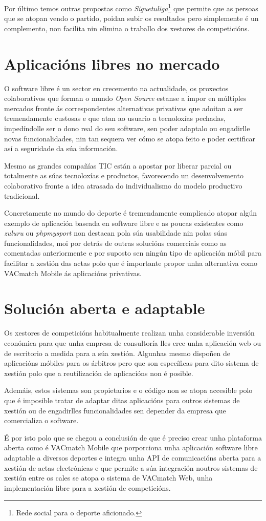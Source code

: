     Por último temos outras propostas como \emph{Siguetuliga}\footnote{Rede 
social para o deporte aficionado.} que permite que as persoas que se atopan 
vendo o partido, poidan subir os resultados pero simplemente é un complemento, 
non facilita nin elimina o traballo dos xestores de competicións.

  \section{Aplicacións libres no mercado}

    O software libre é un sector en crecemento na actualidade, os proxectos 
colaborativos que forman o mundo \emph{Open Source} estanse a impor en múltiples 
mercados fronte ás correspondentes alternativas privativas que adoitan a ser 
tremendamente custosas e que atan ao usuario a tecnoloxías pechadas, 
impedíndolle ser o dono real do seu software, sen poder adaptalo ou engadirlle 
novas funcionalidades, nin tan sequera ver cómo se atopa feito e poder 
certificar así a seguridade da súa información.

    Mesmo as grandes compañías TIC están a apostar por liberar parcial ou totalmente as 
súas tecnoloxías e productos, favorecendo un desenvolvemento colaborativo fronte a idea 
atrasada do individualismo do modelo productivo tradicional.

    Concretamente no mundo do deporte é tremendamente complicado atopar algún 
exemplo de aplicación baseada en software libre e as poucas existentes como 
\emph{zuluru} ou \emph{phpmysport} non destacan pola súa usabilidade nin polas 
súas funcionalidades, moi por detrás de outras solucións comerciais como as 
comentadas anteriormente e por suposto sen ningún tipo de aplicación móbil 
para facilitar a xestión das actas polo que é importante propor unha 
alternativa como VACmatch Mobile ás aplicacións privativas.

  \section{Solución aberta e adaptable}
  Os xestores de competicións habitualmente realizan unha considerable inversión 
económica para que unha empresa de consultoría lles cree unha aplicación web ou de 
escritorio a medida para a súa xestión. Algunhas mesmo dispoñen de aplicacións móbiles 
para os árbitros pero que son específicas para dito sistema de xestión polo que a 
reutilización de aplicacións non é posible.

  Ademáis, estos sistemas son propietarios e o código non se atopa accesible 
polo que é imposible tratar de adaptar ditas aplicacións para outros 
sistemas de xestión ou de engadirlles funcionalidades sen depender da empresa 
que comercializa o software.

  É por isto polo que se chegou a conclusión de que é preciso crear unha 
plataforma aberta como é VACmatch Mobile que porporciona unha aplicación 
software libre adaptable a diversos deportes e integra unha API de comunicacións 
aberta para a xestión de actas electrónicas e que permite a súa integración 
noutros sistemas de xestión entre os cales se atopa o sistema de VACmatch Web, 
unha implementación libre para a xestión de competicións.
